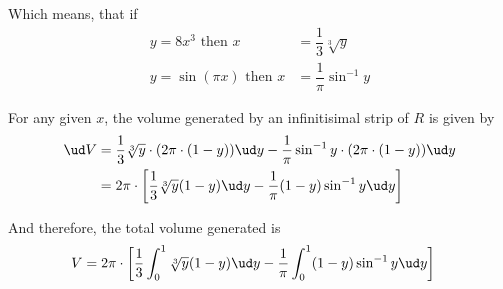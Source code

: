 \begin{parts}
\begin{solution}[\halfpage]
  	Which means, that if 
  	\begin{align}
		y = 8x^3 \text{ then } x &= \dfrac{1}{3}\sqrt[3]{y} \\
		y = \sin(\pi x) \text{ then } x &= \dfrac{1}{\pi}\sin^{-1}y
  	\end{align}
  	
  	For any given $x$, the volume generated by an infinitisimal strip of $R$ is given by
  	\begin{align}
  		\ud V &= \dfrac{1}{3}\sqrt[3]{y}\cdot(2\pi\cdot(1-y))\ud y -
  		         \dfrac{1}{\pi}\sin^{-1}y\cdot(2\pi\cdot(1-y))\ud y \\
  		      &= 2\pi\cdot\left[ \dfrac{1}{3}\sqrt[3]{y}(1-y)\ud y -
  		         \dfrac{1}{\pi}(1-y)\sin^{-1}y\ud y \right]
  	\end{align}
  	
  	And therefore, the total volume generated is
  	\begin{align}
  		V &= 2\pi\cdot\left[ \dfrac{1}{3}\int_0^1\sqrt[3]{y}(1-y)\ud y -
  		         \dfrac{1}{\pi}\int_0^1(1-y)\sin^{-1}y\ud y \right]
  	\end{align}
  \end{solution}

\end{parts}
